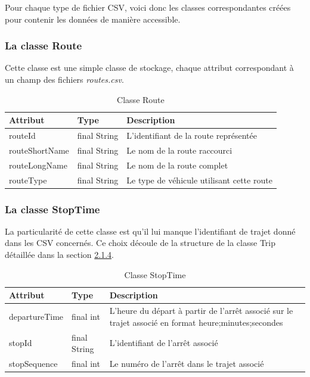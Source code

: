\documentclass[12pt]{article}
\begin{document}
Pour chaque type de fichier CSV, voici donc les classes correspondantes créées pour contenir les données de manière accessible.

\subsubsection{La classe Route}
\label{sec:route}
Cette classe est une simple classe de stockage, chaque attribut correspondant à un champ des fichiers \emph{routes.csv}.

\begin{table}[h]
    \centering
    \begin{tabular}{|l|l|p{8cm}|}
    \hline
    \textbf{Attribut} & \textbf{Type} & \textbf{Description} \\ \hline
    routeId & final String & L'identifiant de la route représentée \\ \hline
    routeShortName & final String & Le nom de la route raccourci \\ \hline
    routeLongName & final String & Le nom de la route complet \\ \hline
    routeType & final String & Le type de véhicule utilisant cette route \\ \hline
    \end{tabular}
    \caption{Classe Route}
\end{table}

\subsubsection{La classe StopTime}
\label{sec:stoptime}
La particularité de cette classe est qu'il lui manque l'identifiant de trajet donné dans les CSV concernés. Ce choix découle
de la structure de la classe Trip détaillée dans la section \hyperref[sec:trip]{2.1.4}.
\begin{table}[h]
    \centering
    \begin{tabular}{|l|l|p{8cm}|}
    \hline
    \textbf{Attribut} & \textbf{Type} & \textbf{Description} \\ \hline
    departureTime & final int & L'heure du départ à partir de
                                   l'arrêt associé sur le trajet associé en format 
                                   heure;minutes;secondes \\ \hline
    stopId & final String & L'identifiant de l'arrêt associé \\ \hline
    stopSequence & final int & Le numéro de l'arrêt dans le trajet associé \\ \hline
    \end{tabular}
    \caption{Classe StopTime}
\end{table}
\end{document}
